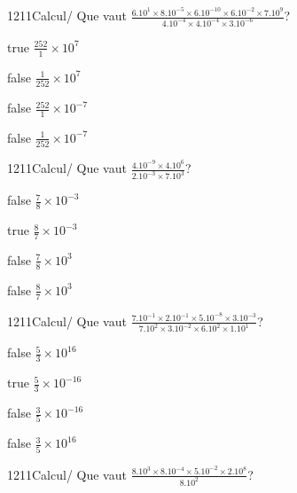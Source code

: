             \begin{question}{1211}{Calcul}{}{/}
                Que vaut $\frac{6.10^{1}\times 8.10^{-5}\times 6.10^{-10}\times 6.10^{-2}\times 7.10^{9}}{4.10^{-4}\times 4.10^{-4}\times 3.10^{-6}}$?
            \end{question}
            \begin{reponses}
                \item[true] $\frac{252}{1}\times 10^{7}$
                \item[false] $\frac{1}{252}\times 10^{7}$
                \item[false] $\frac{252}{1}\times 10^{-7}$
                \item[false] $\frac{1}{252}\times 10^{-7}$
            \end{reponses}
            \begin{question}{1211}{Calcul}{}{/}
                Que vaut $\frac{4.10^{-9}\times 4.10^{6}}{2.10^{-3}\times 7.10^{3}}$?
            \end{question}
            \begin{reponses}
                \item[false] $\frac{7}{8}\times 10^{-3}$
                \item[true] $\frac{8}{7}\times 10^{-3}$
                \item[false] $\frac{7}{8}\times 10^{3}$
                \item[false] $\frac{8}{7}\times 10^{3}$
            \end{reponses}
            \begin{question}{1211}{Calcul}{}{/}
                Que vaut $\frac{7.10^{-1}\times 2.10^{-1}\times 5.10^{-8}\times 3.10^{-3}}{7.10^{2}\times 3.10^{-2}\times 6.10^{2}\times 1.10^{1}}$?
            \end{question}
            \begin{reponses}
                \item[false] $\frac{5}{3}\times 10^{16}$
                \item[true] $\frac{5}{3}\times 10^{-16}$
                \item[false] $\frac{3}{5}\times 10^{-16}$
                \item[false] $\frac{3}{5}\times 10^{16}$
            \end{reponses}
            \begin{question}{1211}{Calcul}{}{/}
                Que vaut $\frac{8.10^{3}\times 8.10^{-4}\times 5.10^{-2}\times 2.10^{8}}{8.10^{2}}$?
            \end{question}
